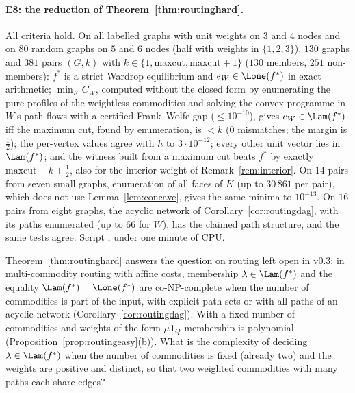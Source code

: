 \paragraph{E8: the reduction of Theorem~\ref{thm:routinghard}.} All criteria hold. On all labelled graphs with unit weights on $3$ and $4$ nodes and on $80$ random graphs on $5$ and $6$ nodes (half with weights in $\{1,2,3\}$), $130$ graphs and $381$ pairs $(G,k)$ with $k\in\{1,\mathrm{maxcut},\mathrm{maxcut}+1\}$ ($130$ members, $251$ non-members): $f^*$ is a strict Wardrop equilibrium and $e_W\in\Lone(f^*)$ in exact arithmetic; $\min_KC_W$, computed without the closed form by enumerating the pure profiles of the weightless commodities and solving the convex programme in $W$'s path flows with a certified Frank--Wolfe gap ($\le10^{-10}$), gives $e_W\in\Lam(f^*)$ iff the maximum cut, found by enumeration, is $<k$ ($0$ mismatches; the margin is $\tfrac12$); the per-vertex values agree with $h$ to $3\cdot10^{-12}$; every other unit vector lies in $\Lam(f^*)$; and the witness built from a maximum cut beats $f^*$ by exactly $\mathrm{maxcut}-k+\tfrac12$, also for the interior weight of Remark~\ref{rem:interior}. On $14$ pairs from seven small graphs, enumeration of all faces of $K$ (up to $30\,861$ per pair), which does not use Lemma~\ref{lem:concave}, gives the same minima to $10^{-13}$. On $16$ pairs from eight graphs, the acyclic network of Corollary~\ref{cor:routingdag}, with its paths enumerated (up to $66$ for $W$), has the claimed path structure, and the same tests agree. Script , under one minute of CPU.

\begin{question}\label{q:multi}
Theorem~\ref{thm:routinghard} answers the question on routing left open in v0.3: in multi-commodity routing with affine costs, membership $\lambda\in\Lam(f^*)$ and the equality $\Lam(f^*)=\Lone(f^*)$ are co-NP-complete when the number of commodities is part of the input, with explicit path sets or with all paths of an acyclic network (Corollary~\ref{cor:routingdag}). With a fixed number of commodities and weights of the form $\mu\mathbf 1_Q$ membership is polynomial (Proposition~\ref{prop:routingeasy}(b)). What is the complexity of deciding $\lambda\in\Lam(f^*)$ when the number of commodities is fixed (already two) and the weights are positive and distinct, so that two weighted commodities with many paths each share edges?
\end{question}
